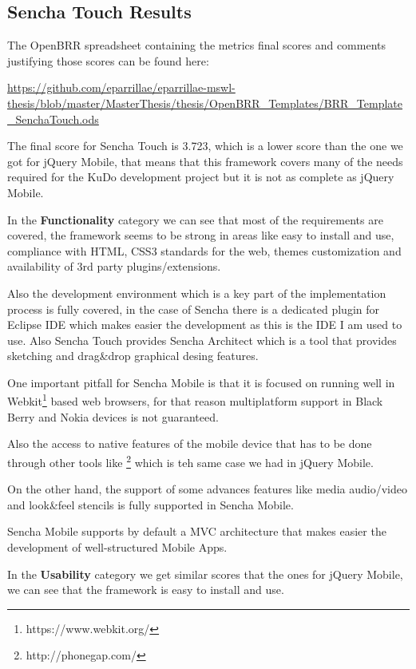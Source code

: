\documentclass[a4paper,12pt]{book}
\begin{document}
\subsection{Sencha Touch Results}
\label{Sencha Touch Results}

The OpenBRR spreadsheet containing the metrics final scores and comments justifying those scores can be found here:

\url{
https://github.com/eparrillae/eparrillae-mswl-thesis/blob/master/MasterThesis/thesis/OpenBRR_Templates/BRR_Template_SenchaTouch.ods}

The final score for Sencha Touch is 3.723, which is a lower score than the one we got for jQuery Mobile, that means that this framework covers many of the needs required for the KuDo development project but it is not as complete as jQuery Mobile.

In the \textbf{Functionality} category we can see that most of the requirements are covered, the framework seems to be strong in areas like easy to install and use, compliance with HTML, CSS3 standards for the web, themes customization and availability of 3rd party plugins/extensions. 

Also the development environment which is a key part of the implementation process is fully covered, in the case of Sencha there is a dedicated plugin for Eclipse IDE\cite{sencha Eclipse Plugin}  which makes easier the development as this is the IDE I am used to use. Also Sencha Touch provides Sencha Architect\cite{sencha Architect} which is a tool that provides sketching and drag\&drop graphical desing features.

One important pitfall for Sencha Mobile is that it is focused on running well in Webkit\footnote{https://www.webkit.org/}  based web browsers, for that reason multiplatform support in Black Berry and Nokia devices is not guaranteed.

Also the access to native features of the mobile device that has to be done through other tools like \footnote{http://phonegap.com/} which is teh same case we had in jQuery Mobile. 

On the other hand, the support of some advances features like media audio/video and look\&feel stencils is fully supported in Sencha Mobile.

Sencha Mobile supports by default a MVC architecture\cite{sencha MVC}  that makes easier the development of well-structured Mobile Apps.

In the \textbf{Usability} category we get similar scores that the ones for jQuery Mobile, we can see that the framework is easy to install and use.
\end{document}
